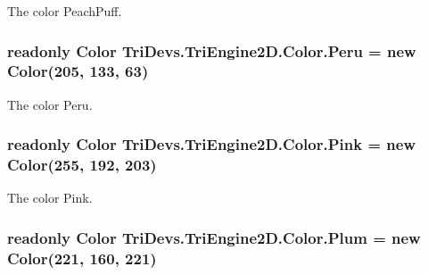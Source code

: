 The color Peach\-Puff. 

\hypertarget{struct_tri_devs_1_1_tri_engine2_d_1_1_color_ad064a2b719a18264e047888e03ec54b6}{
\subsubsection[{Peru}]{\setlength{\rightskip}{0pt plus 5cm}readonly {\bf Color} Tri\-Devs.\-Tri\-Engine2\-D.\-Color.\-Peru = new {\bf Color}(205, 133, 63)\hspace{0.3cm}{\ttfamily [static]}}}\label{struct_tri_devs_1_1_tri_engine2_d_1_1_color_ad064a2b719a18264e047888e03ec54b6}


The color Peru. 

\hypertarget{struct_tri_devs_1_1_tri_engine2_d_1_1_color_a6c34d2bdc0fce11be800fc64d0c60dc9}{
\subsubsection[{Pink}]{\setlength{\rightskip}{0pt plus 5cm}readonly {\bf Color} Tri\-Devs.\-Tri\-Engine2\-D.\-Color.\-Pink = new {\bf Color}(255, 192, 203)\hspace{0.3cm}{\ttfamily [static]}}}\label{struct_tri_devs_1_1_tri_engine2_d_1_1_color_a6c34d2bdc0fce11be800fc64d0c60dc9}


The color Pink. 

\hypertarget{struct_tri_devs_1_1_tri_engine2_d_1_1_color_a15319e839742ec663ec31fc4e89cdc59}{
\subsubsection[{Plum}]{\setlength{\rightskip}{0pt plus 5cm}readonly {\bf Color} Tri\-Devs.\-Tri\-Engine2\-D.\-Color.\-Plum = new {\bf Color}(221, 160, 221)\hspace{0.3cm}{\ttfamily [static]}}}\label{struct_tri_devs_1_1_tri_engine2_d_1_1_color_a15319e839742ec663ec31fc4e89cdc59}


